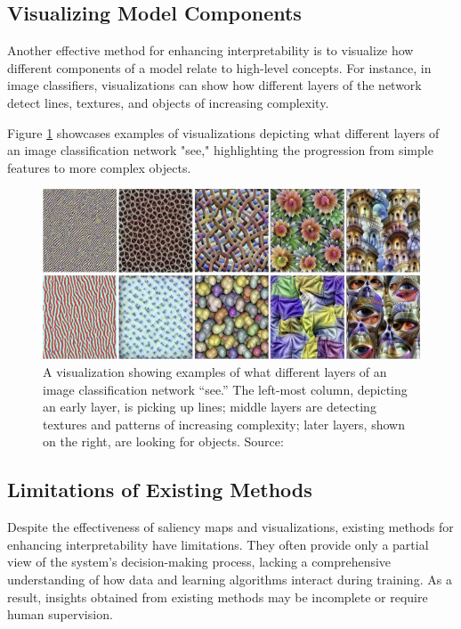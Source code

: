 \subsection{Visualizing Model Components}

Another effective method for enhancing interpretability is to visualize how different components of a model relate to high-level concepts. For instance, in image classifiers, visualizations can show how different layers of the network detect lines, textures, and objects of increasing complexity.

Figure \ref{fig: layer_perspective} showcases examples of visualizations depicting what different layers of an image classification network "see," highlighting the progression from simple features to more complex objects.

\begin{figure}[htbp]
  \centering
  \includegraphics[width=\textwidth]{./Figures/layer_perspective.png}
  \caption{A visualization showing examples of what different layers of an image classification network “see.” The left-most column, depicting an early layer, is picking up lines; middle layers are detecting textures and patterns of increasing complexity; later layers, shown on the right, are looking for objects. Source: \cite{olah2017feature}}
  \label{fig: layer_perspective}
\end{figure}

\subsection{Limitations of Existing Methods}

Despite the effectiveness of saliency maps and visualizations, existing methods for enhancing interpretability have limitations. They often provide only a partial view of the system's decision-making process, lacking a comprehensive understanding of how data and learning algorithms interact during training. As a result, insights obtained from existing methods may be incomplete or require human supervision.


